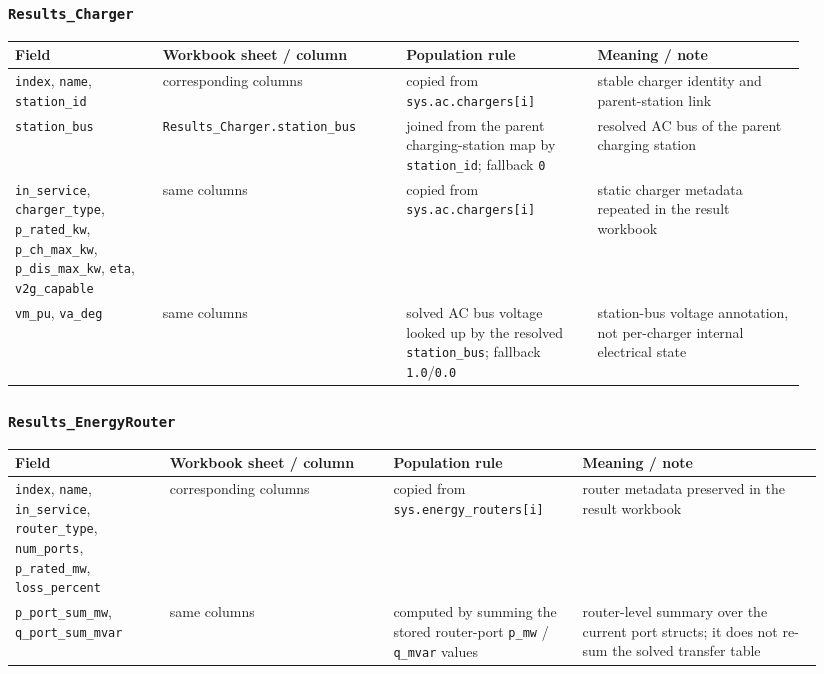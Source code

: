 \subsubsection*{\texttt{Results\_Charger}}

\begin{longtable}{@{}L{0.17\linewidth}L{0.29\linewidth}L{0.22\linewidth}L{0.24\linewidth}@{}}
\toprule
Field & Workbook sheet / column & Population rule & Meaning / note \\
\midrule
\endhead
\texttt{index}, \texttt{name}, \texttt{station\_id} & corresponding columns & copied from \texttt{sys.ac.chargers[i]} & stable charger identity and parent-station link \\
\texttt{station\_bus} & \texttt{Results\_Charger.station\_bus} & joined from the parent charging-station map by \texttt{station\_id}; fallback \texttt{0} & resolved AC bus of the parent charging station \\
\texttt{in\_service}, \texttt{charger\_type}, \texttt{p\_rated\_kw}, \texttt{p\_ch\_max\_kw}, \texttt{p\_dis\_max\_kw}, \texttt{eta}, \texttt{v2g\_capable} & same columns & copied from \texttt{sys.ac.chargers[i]} & static charger metadata repeated in the result workbook \\
\texttt{vm\_pu}, \texttt{va\_deg} & same columns & solved AC bus voltage looked up by the resolved \texttt{station\_bus}; fallback \texttt{1.0}/\texttt{0.0} & station-bus voltage annotation, not per-charger internal electrical state \\
\bottomrule
\end{longtable}

\subsubsection*{\texttt{Results\_EnergyRouter}}

\begin{longtable}{@{}L{0.18\linewidth}L{0.26\linewidth}L{0.22\linewidth}L{0.28\linewidth}@{}}
\toprule
Field & Workbook sheet / column & Population rule & Meaning / note \\
\midrule
\endhead
\texttt{index}, \texttt{name}, \texttt{in\_service}, \texttt{router\_type}, \texttt{num\_ports}, \texttt{p\_rated\_mw}, \texttt{loss\_percent} & corresponding columns & copied from \texttt{sys.energy\_routers[i]} & router metadata preserved in the result workbook \\
\texttt{p\_port\_sum\_mw}, \texttt{q\_port\_sum\_mvar} & same columns & computed by summing the stored router-port \texttt{p\_mw} / \texttt{q\_mvar} values & router-level summary over the current port structs; it does not re-sum the solved transfer table \\
\bottomrule
\end{longtable}

